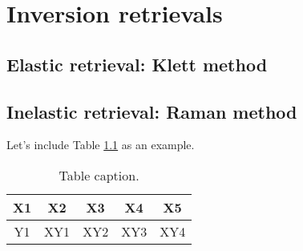 \chapter{Inversion retrievals}
\label{sect:devs02_chapter2}

\section{Elastic retrieval: Klett method}
\label{sect::devs02_chapter2_klett}

\section{Inelastic retrieval: Raman method}
\label{sect::devs02_chapter2_raman}

Let's include Table \ref{tab::table01} as an example.

\begin{table}[h]     
	\caption{Table caption.}
	\label{tab::table01}
	\footnotesize
	\begin{center}
		\begin{tabular}{ccccc}
			\toprule
			X1 & X2 & X3 & X4 & X5\\
			\midrule
            Y1 & XY1 & XY2 & XY3 & XY4\\
			\bottomrule
		\end{tabular}
	\end{center}
\end{table}